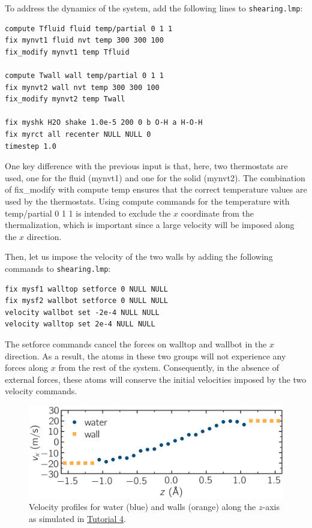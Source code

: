 \documentclass[9pt,tutorial]{livecoms}
\newcommand{\lmpcmd}[1]{\hspace{0pt}\colorbox{listing}{\textcolor{command}{\small{#1}}}\hspace{0pt}} %
\newcommand{\flecmd}[1]{\textcolor{command}{\texttt{#1}}} %
\begin{document}
To address the dynamics of the system, add the following lines to
\flecmd{shearing.lmp}:
\begin{lstlisting}
compute Tfluid fluid temp/partial 0 1 1
fix mynvt1 fluid nvt temp 300 300 100
fix_modify mynvt1 temp Tfluid

compute Twall wall temp/partial 0 1 1
fix mynvt2 wall nvt temp 300 300 100
fix_modify mynvt2 temp Twall

fix myshk H2O shake 1.0e-5 200 0 b O-H a H-O-H
fix myrct all recenter NULL NULL 0
timestep 1.0
\end{lstlisting}

One key difference with the previous input is that, here, two thermostats are used,
one for the fluid (\lmpcmd{mynvt1}) and one for the solid (\lmpcmd{mynvt2}).
The combination of \lmpcmd{fix\_modify} with \lmpcmd{compute temp} ensures
that the correct temperature values are used by the thermostats.  Using
\lmpcmd{compute} commands for the temperature with \lmpcmd{temp/partial 0 1 1} is
intended to exclude the $x$ coordinate from the thermalization, which is important since a
large velocity will be imposed along the $x$ direction.

Then, let us impose the velocity of the two walls by adding the following
commands to \flecmd{shearing.lmp}:
\begin{lstlisting}
fix mysf1 walltop setforce 0 NULL NULL
fix mysf2 wallbot setforce 0 NULL NULL
velocity wallbot set -2e-4 NULL NULL
velocity walltop set 2e-4 NULL NULL
\end{lstlisting}
The \lmpcmd{setforce} commands cancel the forces on \lmpcmd{walltop} and
\lmpcmd{wallbot} {\color{blue}in the $x$ direction}.  As a result, the atoms in these two groups will not
experience any forces {\color{blue}along $x$} from the rest of the system.  Consequently, in the absence of
external forces, these atoms will conserve the initial velocities imposed by the
two \lmpcmd{velocity} commands.

\begin{figure}
\centering
\includegraphics[width=\linewidth]{NANOSHEAR-profiles}
\caption{Velocity profiles for water (blue) and walls (orange) along the $z$-axis as
simulated in \hyperref[sheared-confined-label]{Tutorial 4}.}
\label{fig:NANOSHEAR-profiles}
\end{figure}
\end{document}
